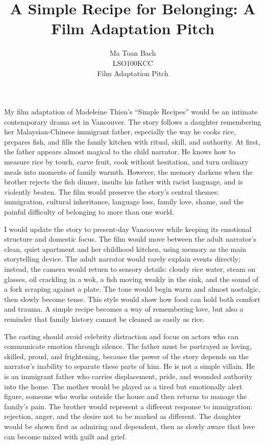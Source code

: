 \documentclass[12pt]{article}
\title{A Simple Recipe for Belonging: A Film Adaptation Pitch}
\author{%
  Ma Toan Bach\\
  LSO100KCC\\
  Film Adaptation Pitch
}
\date{}
\begin{document}
\maketitle

My film adaptation of Madeleine Thien's ``Simple Recipes'' would be an intimate contemporary drama set in Vancouver. The story follows a daughter remembering her Malaysian-Chinese immigrant father, especially the way he cooks rice, prepares fish, and fills the family kitchen with ritual, skill, and authority. At first, the father appears almost magical to the child narrator. He knows how to measure rice by touch, carve fruit, cook without hesitation, and turn ordinary meals into moments of family warmth. However, the memory darkens when the brother rejects the fish dinner, insults his father with racist language, and is violently beaten. The film would preserve the story's central themes: immigration, cultural inheritance, language loss, family love, shame, and the painful difficulty of belonging to more than one world.

I would update the story to present-day Vancouver while keeping its emotional structure and domestic focus. The film would move between the adult narrator's clean, quiet apartment and her childhood kitchen, using memory as the main storytelling device. The adult narrator would rarely explain events directly; instead, the camera would return to sensory details: cloudy rice water, steam on glasses, oil crackling in a wok, a fish moving weakly in the sink, and the sound of a fork scraping against a plate. The tone would begin warm and almost nostalgic, then slowly become tense. This style would show how food can hold both comfort and trauma. A simple recipe becomes a way of remembering love, but also a reminder that family history cannot be cleaned as easily as rice.

The casting should avoid celebrity distraction and focus on actors who can communicate emotion through silence. The father must be portrayed as loving, skilled, proud, and frightening, because the power of the story depends on the narrator's inability to separate these parts of him. He is not a simple villain. He is an immigrant father who carries displacement, pride, and wounded authority into the home. The mother would be played as a tired but emotionally alert figure, someone who works outside the house and then returns to manage the family's pain. The brother would represent a different response to immigration: rejection, anger, and the desire not to be marked as different. The daughter would be shown first as admiring and dependent, then as slowly aware that love can become mixed with guilt and grief.
\end{document}
